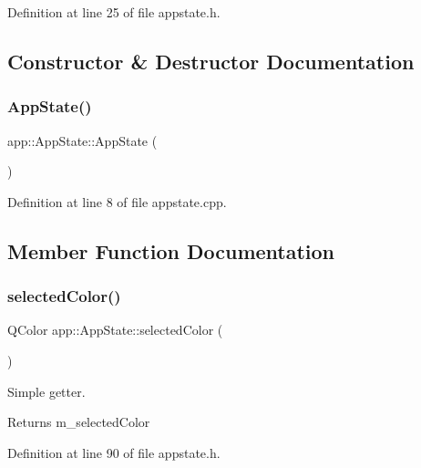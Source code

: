 Definition at line 25 of file appstate.\+h.



\subsection{Constructor \& Destructor Documentation}
\mbox{\label{classapp_1_1_app_state_a467580496a0d9b8641373c52b4cb3918}} 
\subsubsection{\texorpdfstring{App\+State()}{AppState()}}
{\footnotesize\ttfamily app\+::\+App\+State\+::\+App\+State (\begin{DoxyParamCaption}{ }\end{DoxyParamCaption})}



Definition at line 8 of file appstate.\+cpp.



\subsection{Member Function Documentation}
\mbox{\label{classapp_1_1_app_state_a05c87aa8f14b8689902f8aaa363adcc7}} 
\subsubsection{\texorpdfstring{selected\+Color()}{selectedColor()}}
{\footnotesize\ttfamily Q\+Color app\+::\+App\+State\+::selected\+Color (\begin{DoxyParamCaption}{ }\end{DoxyParamCaption})\hspace{0.3cm}{\ttfamily [inline]}}

Simple getter. \begin{DoxyReturn}{Returns}
m\+\_\+selected\+Color 
\end{DoxyReturn}


Definition at line 90 of file appstate.\+h.


